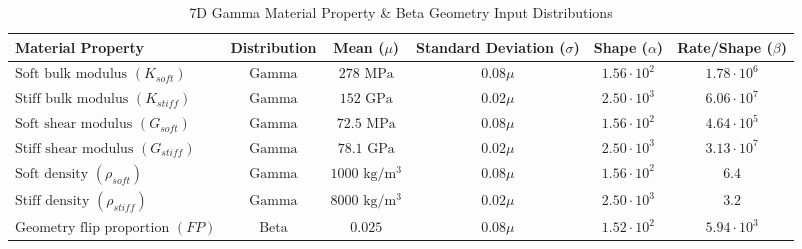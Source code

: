 \documentclass[preprint,review,12pt]{elsarticle}
\begin{document}
\begin{table}[H]
\centering
\tiny
\caption{7D Gamma Material Property \& Beta Geometry Input Distributions}
\label{7D_Gamma_Input_Table}
\begin{tabularx}{\linewidth}{Xccccc} 
\toprule
Material Property & Distribution & Mean ($\mu$) & Standard Deviation ($\sigma$) & Shape ($\alpha$) & Rate/Shape ($\beta$) \\
\midrule
\( \text{Soft bulk modulus } (K_{soft})\) & \( \text{Gamma} \) & \( 278 \text{ MPa} \) & \( 0.08\mu \) & \( 1.56\cdot10^2 \) & \( 1.78\cdot10^6 \) \\
\( \text{Stiff bulk modulus } (K_{stiff})\) & \( \text{Gamma} \) & \( 152 \text{ GPa} \) & \( 0.02\mu \) & \( 2.50\cdot10^3 \) & \( 6.06\cdot10^7 \) \\
\( \text{Soft shear modulus } (G_{soft})\) & \( \text{Gamma} \) & \( 72.5 \text{ MPa} \) & \( 0.08\mu \) & \( 1.56\cdot10^2 \) & \( 4.64\cdot10^5 \) \\
\( \text{Stiff shear modulus } (G_{stiff})\) & \( \text{Gamma} \) & \( 78.1 \text{ GPa} \) & \( 0.02\mu \) & \( 2.50\cdot10^3 \) & \( 3.13\cdot10^7 \) \\
\( \text{Soft density } (\rho_{soft})\) & \( \text{Gamma} \) & \( 1000 \text{ kg/m$^3$} \) & \( 0.08\mu \) & \( 1.56\cdot10^2 \) & \( 6.4 \) \\
\( \text{Stiff density } (\rho_{stiff})\) & \( \text{Gamma} \) & \( 8000 \text{ kg/m$^3$} \) & \( 0.02\mu \) & \( 2.50\cdot10^3 \) & \( 3.2 \) \\
\( \text{Geometry flip proportion }  (FP)\) & \( \text{Beta} \) & \( 0.025 \) & \( 0.08\mu \) & \( 1.52\cdot10^2 \) & \( 5.94\cdot10^3 \) \\
\bottomrule
\end{tabularx}
\end{table}

\end{document}
